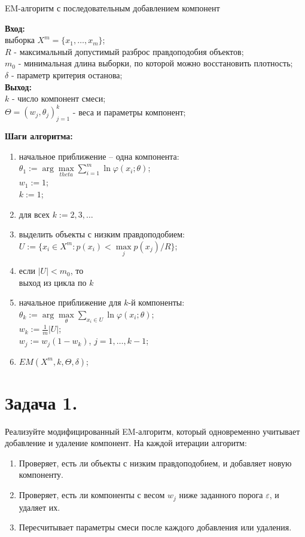 \begin{algorithm}[H]
\caption{EM-алгоритм с последовательным добавлением компонент}
\textbf{Вход:} \\
выборка $X^m = \{x_1, \ldots, x_m\}$;\\
$R$ - максимальный допустимый разброс правдоподобия объектов;\\
$m_0$ - минимальная длина выборки, по которой можно восстановить плотность;\\
$\delta$ - параметр критерия останова; \\
\textbf{Выход:} \\
$k$ - число компонент смеси;\\
$\Theta = (w_j, \theta_j)_{j = 1}^k$ - веса и параметры компонент;

\textbf{Шаги алгоритма:}
\begin{enumerate}
    \item начальное приближение -- одна компонента:\\
        $\theta_1 := \arg\max\limits_{theta}\sum\limits_{i=1}^m \ln{\varphi(x_i; \theta)}$; \\
        $w_1 := 1$;\\
        $k := 1$;
    \item для всех $k := 2, 3, \ldots$
    \item выделить объекты с низким правдоподобием: \\
        $U := \{x_i \in X^m : p(x_i) < \max\limits_{j} p(x_j) / R\}$;
    \item если $|U| < m_0$, то \\
          выход из цикла по $k$
    \item начальное приближение для $k$-й компоненты:\\
        $\theta_k := \arg\max\limits_{\theta}\sum\limits_{x_i \in U} \ln{\varphi(x_i; \theta)}$;\\
        $w_k := \frac{1}{m}|U|$; \\
        $w_j := w_j(1 - w_k)$, $j = 1, \ldots, k - 1$;
    \item $EM(X^m, k, \Theta, \delta)$;
\end{enumerate}
\end{algorithm}

\section*{\textbf{Задача 1.}} Реализуйте модифицированный EM-алгоритм, который одновременно учитывает добавление и удаление компонент. На каждой итерации алгоритм:
\begin{enumerate}
\item Проверяет, есть ли объекты с низким правдоподобием, и добавляет новую компоненту.
\item Проверяет, есть ли компоненты с весом $w_j$ ниже заданного порога $\varepsilon$, и удаляет их.
\item Пересчитывает параметры смеси после каждого добавления или удаления.
\end{enumerate}

